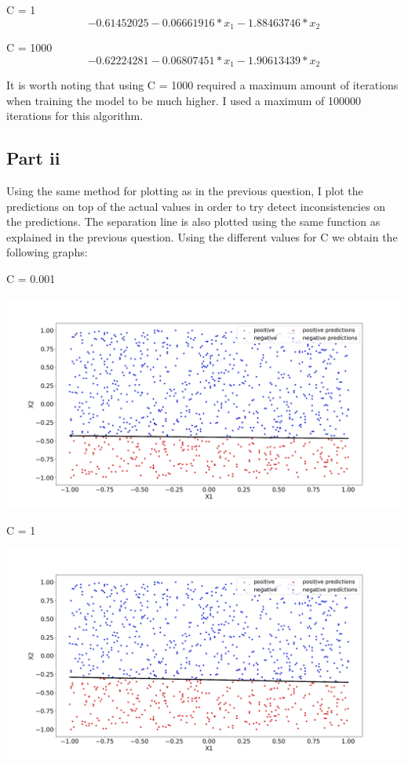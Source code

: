 \documentclass[10pt]{article}
\begin{document}
C = 1
\begin{equation*}
    -0.61452025 - 0.06661916 * x_{1} - 1.88463746 * x_{2}
\end{equation*}

C = 1000
\begin{equation*}
    -0.62224281 - 0.06807451 * x_{1} - 1.90613439 * x_{2}
\end{equation*}



It is worth noting that using C = 1000 required a maximum amount of iterations
when training the model to be much higher. I used a maximum of 100000 iterations
for this algorithm.

\subsection*{Part ii}
Using the same method for plotting as in the previous question,
I plot the predictions on top of the actual values in order to try
detect inconsistencies on the predictions. The separation
line is also plotted using the same function as explained
in the previous question. Using the different values for C we
obtain the following graphs:

C = 0.001

\includegraphics[scale=0.5]{Figure_C_0001.png}

C = 1

\includegraphics[scale=0.245]{Figure_C_1.png}
\end{document}
